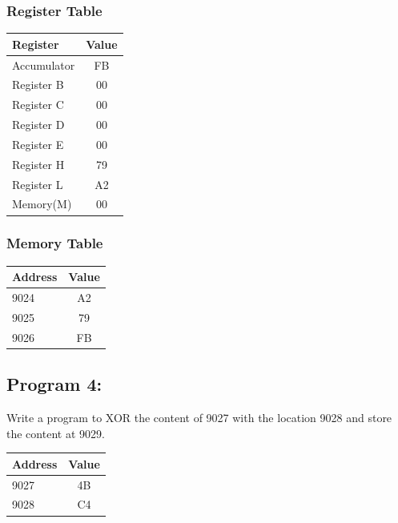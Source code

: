 \documentclass[]{report}
\begin{document}
\subsubsection {Register Table}
\begin{tabular}{lc}
    \hline
    Register & Value\\
    \hline
    Accumulator     & FB        \\
    Register B      &  00        \\
    Register C      &  00        \\
    Register D      &   00       \\
    Register E      &   00       \\
    Register H      &  79        \\
    Register L      &  A2         \\
    Memory(M)       &      00         \\
    \hline
\end{tabular}
\subsubsection {Memory Table}
\begin{tabular}{lc}
    \hline
    Address & Value  \\
    \hline
    9024       &      A2         \\
    9025 & 79 \\
    9026 & FB\\
    \hline
\end{tabular}




\vspace{10mm}
\subsection*{Program 4: }
Write a program to XOR the content of 9027 with the location 9028 and store the content at 9029. \\
\begin{tabular}{lc}
    \hline
    Address & Value  \\
    \hline
    9027 & 4B \\
    9028 & C4 \\
    \hline
\end{tabular}
\end{document}
